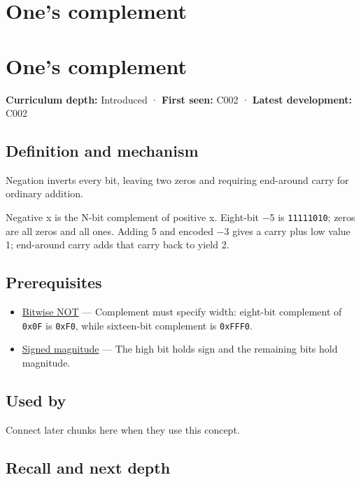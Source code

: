 \hypertarget{appendix-03c678cd40b3}{}
\section*{One's complement}
\section{One's complement}\label{appendix-03c678cd40b3-ones-complement}

\textbf{Curriculum depth:} Introduced · \textbf{First seen:} C002 · \textbf{Latest development:} C002

\subsection{Definition and mechanism}\label{appendix-03c678cd40b3-definition-and-mechanism}

Negation inverts every bit, leaving two zeros and requiring end-around carry for ordinary addition.

Negative x is the N-bit complement of positive x. Eight-bit −5 is \texttt{11111010}; zeros are all zeros and all ones. Adding 5 and encoded −3 gives a carry plus low value 1; end-around carry adds that carry back to yield 2.

\subsection{Prerequisites}\label{appendix-03c678cd40b3-prerequisites}

\begin{itemize}
\tightlist
\item
  \hyperref[appendix-8f38927cfc54]{Bitwise NOT} --- Complement must specify width: eight-bit complement of \texttt{0x0F} is \texttt{0xF0}, while sixteen-bit complement is \texttt{0xFFF0}.
\item
  \hyperref[appendix-ce20506c8532]{Signed magnitude} --- The high bit holds sign and the remaining bits hold magnitude.
\end{itemize}

\subsection{Used by}\label{appendix-03c678cd40b3-used-by}

Connect later chunks here when they use this concept.

\subsection{Recall and next depth}\label{appendix-03c678cd40b3-recall-and-next-depth}

